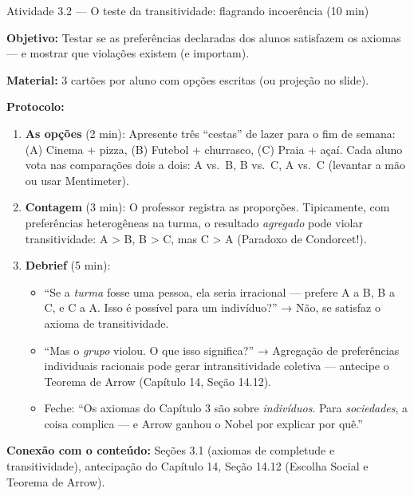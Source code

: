 \documentclass[11pt,twoside,openright]{book}
\providecommand{\tightlist}{\setlength{\itemsep}{0pt}\setlength{\parskip}{0pt}}
\begin{document}
\begin{classroombox}{Atividade 3.2 — O teste da transitividade: flagrando incoerência (10 min)}

\textbf{Objetivo:} Testar se as preferências declaradas dos alunos
satisfazem os axiomas --- e mostrar que violações existem (e importam).

\textbf{Material:} 3 cartões por aluno com opções escritas (ou projeção
no slide).

\textbf{Protocolo:}

\begin{enumerate}
\def\labelenumi{\arabic{enumi}.}
\tightlist
\item
  \textbf{As opções} (2 min): Apresente três ``cestas'' de lazer para o
  fim de semana: (A) Cinema + pizza, (B) Futebol + churrasco, (C) Praia
  + açaí. Cada aluno vota nas comparações dois a dois: A vs.~B, B vs.~C,
  A vs.~C (levantar a mão ou usar Mentimeter).
\item
  \textbf{Contagem} (3 min): O professor registra as proporções.
  Tipicamente, com preferências heterogêneas na turma, o resultado
  \emph{agregado} pode violar transitividade: A \textgreater{} B, B
  \textgreater{} C, mas C \textgreater{} A (Paradoxo de Condorcet!).
\item
  \textbf{Debrief} (5 min):

  \begin{itemize}
  \tightlist
  \item
    ``Se a \emph{turma} fosse uma pessoa, ela seria irracional ---
    prefere A a B, B a C, e C a A. Isso é possível para um indivíduo?''
    → Não, se satisfaz o axioma de transitividade.
  \item
    ``Mas o \emph{grupo} violou. O que isso significa?'' → Agregação de
    preferências individuais racionais pode gerar intransitividade
    coletiva --- antecipe o Teorema de Arrow (Capítulo 14, Seção 14.12).
  \item
    Feche: ``Os axiomas do Capítulo 3 são sobre \emph{indivíduos}. Para
    \emph{sociedades}, a coisa complica --- e Arrow ganhou o Nobel por
    explicar por quê.''
  \end{itemize}
\end{enumerate}

\textbf{Conexão com o conteúdo:} Seções 3.1 (axiomas de completude e
transitividade), antecipação do Capítulo 14, Seção 14.12 (Escolha Social
e Teorema de Arrow).

\end{classroombox}
\end{document}

